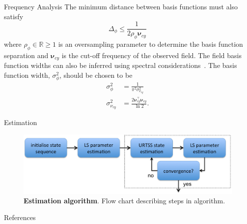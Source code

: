 \documentclass[final]{beamer}
\newlength{\onecolwid}
\begin{document}
\begin{frame}[t]
\begin{columns}[t]
\begin{column}{\onecolwid}
\begin{block}{Frequency Analysis}
{		The minimum distance between basis functions must also satisfy 
		\begin{equation}\label{eq:BasisFunctionSeparation}
			\Delta_{\phi} \leq \frac{1}{2\rho_{\phi}\boldsymbol{\nu}_{cy}}
		\end{equation}
		where $\rho_{\phi} \in \mathbb{R} \ge 1$ is an oversampling parameter to determine the basis function separation and $\boldsymbol{\nu}_{cy}$ is the cut-off frequency of the observed field.
		The field basis function widths can also be inferred using spectral considerations~\cite{Scerri2009}. The basis function width, $\sigma^2_{\phi}$, should be chosen to be
		\begin{align}\label{eq:WidthCutOffRelationship}
		 \sigma^2_{\phi} &= \frac{1}{\pi^2\sigma_{\nu_{cy}}^2} \\
		 \sigma^2_{\nu_{cy}} &= \frac{2\boldsymbol\nu_{cy}^\top \boldsymbol\nu_{cy}}{\ln2}.
		\end{align}}
	\end{block}
	\begin{block}{Estimation}
		\begin{figure}	
		\begin{center}
		  \includegraphics[width=10in, scale = 10]{EstimationAlgorithm.eps}
		\end{center}
		\caption{{\bf Estimation algorithm}. Flow chart describing steps in algorithm.} 
		\label{fig:Estimation Algorithm}	
		\end{figure} 
	\end{block}	
	\begin{block}{References}
        \small{}	\end{block}
\end{column}


\end{columns}
\end{frame}
\end{document}

